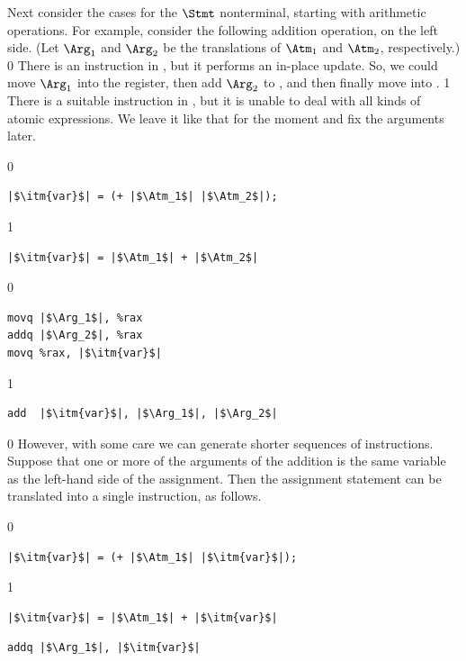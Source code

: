 \documentclass[7x10]{TimesAPriori_MIT}%
\def\racketEd{0}
\def\pythonEd{1}
\def\edition{1}
\def\xeightysixEd{0}
\def\riscvEd{1}
\def\architecture{1}
\newcommand{\pythonColor}[0]{}
\numberwithin{theorem}{chapter}
\numberwithin{definition}{chapter}
\numberwithin{equation}{chapter}
\begin{document}
Next consider the cases for the $\Stmt$ nonterminal, starting with
arithmetic operations. For example, consider the following addition
operation, on the left side.  (Let $\Arg_1$ and $\Arg_2$ be the
translations of $\Atm_1$ and $\Atm_2$, respectively.)
\if\architecture\xeightysixEd
There is an
 instruction in {\ArchName}, but it performs an in-place update.
%
So, we could move $\Arg_1$ into the  register, then add
$\Arg_2$ to , and then finally move  into
.
\fi
\if\architecture\riscvEd
There is a suitable  instruction in {\ArchName}, but it is
unable to deal with all kinds of atomic expressions.
%
We leave it like that for the moment and fix the arguments later.
\fi
\begin{transformation}
{\if\edition\racketEd    
\begin{lstlisting}
|$\itm{var}$| = (+ |$\Atm_1$| |$\Atm_2$|);
\end{lstlisting}
\fi}
{\if\edition\pythonEd\pythonColor
\begin{lstlisting}
|$\itm{var}$| = |$\Atm_1$| + |$\Atm_2$|
\end{lstlisting}
\fi}
\compilesto
\if\architecture\xeightysixEd
\begin{lstlisting}
movq |$\Arg_1$|, %rax
addq |$\Arg_2$|, %rax
movq %rax, |$\itm{var}$|
\end{lstlisting}
\fi
\if\architecture\riscvEd
\begin{lstlisting}
add  |$\itm{var}$|, |$\Arg_1$|, |$\Arg_2$|
\end{lstlisting}
\fi
\end{transformation}
%
\if\architecture\xeightysixEd
However, with some care we can generate shorter sequences of
instructions. Suppose that one or more of the arguments of the
addition is the same variable as the left-hand side of the assignment.
Then the assignment statement can be translated into a single
 instruction, as follows.
\begin{transformation}
{\if\edition\racketEd
\begin{lstlisting}
|$\itm{var}$| = (+ |$\Atm_1$| |$\itm{var}$|);
\end{lstlisting}
\fi}
{\if\edition\pythonEd\pythonColor
\begin{lstlisting}
|$\itm{var}$| = |$\Atm_1$| + |$\itm{var}$|
\end{lstlisting}
\fi}    
\compilesto
\begin{lstlisting}
addq |$\Arg_1$|, |$\itm{var}$|
\end{lstlisting}
\end{transformation}
\end{document}

